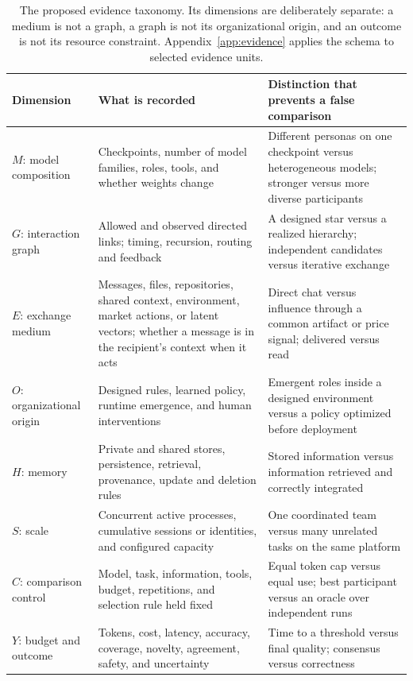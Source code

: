 \begin{table}[t]
\centering\small
\begin{tabularx}{\textwidth}{@{}p{}YY@{}}
\toprule
Dimension & What is recorded & Distinction that prevents a false comparison\\
\midrule
$M$: model composition & Checkpoints, number of model families, roles, tools, and whether weights change & Different personas on one checkpoint versus heterogeneous models; stronger versus more diverse participants\\
$G$: interaction graph & Allowed and observed directed links; timing, recursion, routing and feedback & A designed star versus a realized hierarchy; independent candidates versus iterative exchange\\
$E$: exchange medium & Messages, files, repositories, shared context, environment, market actions, or latent vectors; whether a message is in the recipient's context when it acts & Direct chat versus influence through a common artifact or price signal; delivered versus read\\
$O$: organizational origin & Designed rules, learned policy, runtime emergence, and human interventions & Emergent roles inside a designed environment versus a policy optimized before deployment\\
$H$: memory & Private and shared stores, persistence, retrieval, provenance, update and deletion rules & Stored information versus information retrieved and correctly integrated\\
$S$: scale & Concurrent active processes, cumulative sessions or identities, and configured capacity & One coordinated team versus many unrelated tasks on the same platform\\
$C$: comparison control & Model, task, information, tools, budget, repetitions, and selection rule held fixed & Equal token cap versus equal use; best participant versus an oracle over independent runs\\
$Y$: budget and outcome & Tokens, cost, latency, accuracy, coverage, novelty, agreement, safety, and uncertainty & Time to a threshold versus final quality; consensus versus correctness\\
\bottomrule
\end{tabularx}
\caption{The proposed evidence taxonomy. Its dimensions are deliberately separate: a medium is not a graph, a graph is not its organizational origin, and an outcome is not its resource constraint. Appendix~\ref{app:evidence} applies the schema to selected evidence units.}
\label{tab:taxonomy}
\end{table}

